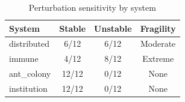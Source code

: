 \begin{table}[htbp]
\centering
\caption{Perturbation sensitivity by system}
\begin{tabular}{lccc}
\hline
System & Stable & Unstable & Fragility \\
\hline
distributed & 6/12 & 6/12 & Moderate \\
immune & 4/12 & 8/12 & Extreme \\
ant_colony & 12/12 & 0/12 & None \\
institution & 12/12 & 0/12 & None \\
\hline
\end{tabular}
\end{table}
